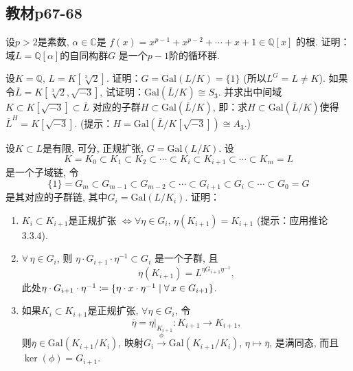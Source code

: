 \subsection{教材p67-68}

\begin{problem}
    设$p > 2$是素数, $\alpha \in \mathbb{C}$是
$f(x) = x^{p - 1} + x^{p - 2} + \cdots + x + 1 \in \mathbb{Q}[x]$
的根. 证明：域$L = \mathbb{Q}[\alpha]$的自同构群$G$
是一个$p - 1$阶的循环群.
\end{problem}

\begin{solution}
    
\end{solution}

\begin{problem}
    设$K = \mathbb{Q},\, L = K[\sqrt[3]{2}]$.
证明：$G = \mathrm{Gal}(L/K)=\{1\}$ (所以$L^G = L \neq K$).
如果令$\overline{L} = K[\sqrt[3]{2}, \sqrt{-3}]$,
试证明：$\mathrm{Gal}(\overline{L}/K) \cong S_3$.
并求出中间域$K \subset K[\sqrt{-3}] \subset \overline{L}$
对应的子群$H \subset \mathrm{Gal}(\overline L/K)$,
即：求$H \subset \mathrm{Gal}(\overline L/K)$使得
$\overline{L}^{H} = K[\sqrt{-3}]$.
(提示：$H = \mathrm{Gal}(\overline L/K[\sqrt{-3}]) \cong A_3$.)
\end{problem}

\begin{solution}
    
\end{solution}

\begin{problem}
    设$K \subset L$是有限, 可分, 正规扩张, $G = \mathrm{Gal}(L/K)$.
设
\[
    K = K_0 \subset K_1 \subset K_2 \subset \cdots \subset K_i \subset K_{i + 1} \subset \cdots \subset K_m = L
\]
是一个子域链, 令
\[
    \{1\} = G_m \subset G_{m - 1} \subset G_{m - 2} \subset \cdots \subset G_{i + 1} \subset G_i \subset \cdots \subset G_0 = G
\]
是其对应的子群链, 其中$G_i = \mathrm{Gal}(L/K_i)$. 证明：
\begin{enumerate}[(1)]
    \item $K_i \subset K_{i + 1}$是正规扩张
$\Leftrightarrow \forall \eta \in G_i,\, \eta(K_{i + 1}) = K_{i + 1}$
(提示：应用推论3.3.4).
    \item $\forall\, \eta \in G_i$, 则
$\eta \cdot G_{i + 1} \cdot \eta^{-1} \subset G_i$
是一个子群, 且
\[
    \eta(K_{i + 1}) = L^{\eta G_{i + 1}\eta^{-1}},
\]
此处$\eta \cdot G_{i + 1} \cdot \eta ^{- 1} \mathrel{\coloneqq} \{\eta \cdot x \cdot \eta^{-1} \mid \forall\, x \in G_{i + 1}\}$.
    \item 如果$K_i \subset K_{i + 1}$是正规扩张, $\forall \eta \in G_i$,
令
\[
    \bar{\eta} = \eta|_{K_{i + 1}}:K_{i + 1} \to K_{i + 1},
\]
则$\bar{\eta} \in \mathrm{Gal}(K_{i + 1}/K_i)$,
映射$G_i \overset{\phi}\to \mathrm{Gal}(K_{i + 1}/K_i)$,
$\eta \mapsto \bar{\eta}$, 是满同态, 而且
$\ker(\phi) = G_{i + 1}$.
\end{enumerate}
\end{problem}

\begin{solution}
    
\end{solution}